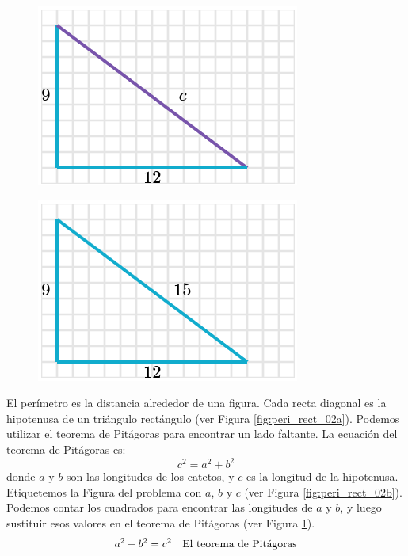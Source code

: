 \begin{solutionbox}{16cm}
\begin{minipage}{0.3\textwidth}
        \begin{figure}[H]
            \centering
            \includegraphics[width=0.6\linewidth]{../images/peri_rect_02c.png}
            \caption{}
            \label{fig:peri_rect_02c}
        \end{figure}
        \begin{figure}[H]
            \centering
            \includegraphics[width=0.6\linewidth]{../images/peri_rect_02d.png}
            \caption{}
            \label{fig:peri_rect_02d}
        \end{figure}
    \end{minipage}\hfill
    \begin{minipage}{0.65\textwidth}
        El perímetro es la distancia alrededor de una figura.
        Cada recta diagonal es la hipotenusa de un triángulo rectángulo (ver Figura \ref{fig:peri_rect_02a}).
        Podemos utilizar el teorema de Pitágoras para encontrar un lado faltante.
        La ecuación del teorema de Pitágoras es:
        \[c^2=a^2+b^2\]
        donde $a$ y $b$ son las longitudes de los catetos, y $c$ es la longitud de la hipotenusa.
        Etiquetemos la Figura del problema con $a$, $b$ y $c$ (ver Figura \ref{fig:peri_rect_02b}).
        Podemos contar los cuadrados para encontrar las longitudes de $a$ y $b$, y luego sustituir esos valores en el teorema de Pitágoras (ver Figura \ref{fig:peri_rect_02c}).
        \begin{align*}
            a^2+b^2  =c^2  & \text{\quad El teorema de Pitágoras}                          \\

\end{align*}
\end{minipage}
\end{solutionbox}
